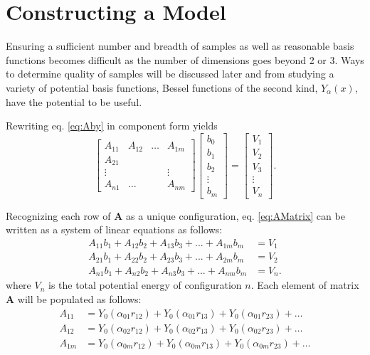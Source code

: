 \section{Constructing a Model}\label{Sect:LJModels}
\par Ensuring a sufficient number and breadth of samples as well as reasonable basis functions becomes difficult as the number of dimensions goes beyond 2 or 3. Ways to determine quality of samples will be discussed later and from studying a variety of potential basis functions, Bessel functions of the second kind, $Y_\alpha(x)$, have the potential to be useful.
\par Rewriting eq. \ref{eq:Aby} in component form yields
\begin{equation}
\begin{bmatrix}
A_{11} & A_{12} & \ldots & A_{1m} \\
A_{21} \\
\vdots & & & \vdots\\
A_{n1} & \ldots & & A_{nm}
\end{bmatrix}
\begin{bmatrix}
b_0 \\
b_1 \\
b_2 \\
\vdots \\
b_m 
\end{bmatrix}
=
\begin{bmatrix}
V_1 \\
V_2 \\
V_3 \\ 
\vdots \\
V_n
\end{bmatrix}.
\label{eq:AMatrix}
\end{equation}
\par Recognizing each row of $\mathbf{A}$ as a unique configuration, eq. \ref{eq:AMatrix} can be written as a system of linear equations as follows:
\begin{align}
A_{11}b_1 + A_{12}b_2 + A_{13}b_3 + ... + A_{1m}b_m &= V_1 \nonumber \\
A_{21}b_1 + A_{22}b_2 + A_{23}b_3 + ... + A_{2m}b_m &= V_2 \nonumber \\
A_{n1}b_1 + A_{n2}b_2 + A_{n3}b_3 + ... + A_{nm}b_m &= V_n.
\end{align}
where $V_n$ is the total potential energy of configuration $n$. Each element of matrix $\mathbf{A}$ will be populated as follows:
\begin{align}
A_{11} &= Y_0(\alpha_{01} r_{12}) + Y_0(\alpha_{01} r_{13}) + Y_0(\alpha_{01} r_{23}) + \ldots \nonumber \\
A_{12} &= Y_0(\alpha_{02} r_{12}) + Y_0(\alpha_{02} r_{13}) + Y_0(\alpha_{02} r_{23}) + \ldots \nonumber \\
A_{1m} &= Y_0(\alpha_{0m} r_{12}) + Y_0(\alpha_{0m} r_{13}) + Y_0(\alpha_{0m} r_{23}) + \ldots \label{eq:fillBessel}
\end{align}
